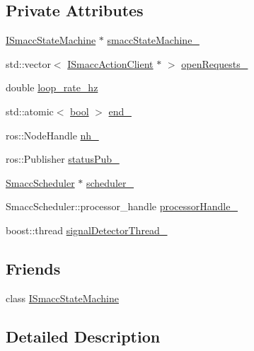 \subsection*{Private Attributes}
\begin{DoxyCompactItemize}
\item 
\hyperlink{classsmacc_1_1ISmaccStateMachine}{I\+Smacc\+State\+Machine} $\ast$ \hyperlink{classsmacc_1_1SignalDetector_a46025de6ac7b5980e22144f9703236a4}{smacc\+State\+Machine\+\_\+}
\item 
std\+::vector$<$ \hyperlink{classsmacc_1_1ISmaccActionClient}{I\+Smacc\+Action\+Client} $\ast$ $>$ \hyperlink{classsmacc_1_1SignalDetector_a3f7e46b9fa9fcac9f5bc72a95ab20ca9}{open\+Requests\+\_\+}
\item 
double \hyperlink{classsmacc_1_1SignalDetector_a41a2ae4262ed350f46d8b886bdc1dfa5}{loop\+\_\+rate\+\_\+hz}
\item 
std\+::atomic$<$ \hyperlink{classbool}{bool} $>$ \hyperlink{classsmacc_1_1SignalDetector_aaee266393c01693528a2d74b1f2354a2}{end\+\_\+}
\item 
ros\+::\+Node\+Handle \hyperlink{classsmacc_1_1SignalDetector_a5c416677fd537afc79f2fbc2e68b2dee}{nh\+\_\+}
\item 
ros\+::\+Publisher \hyperlink{classsmacc_1_1SignalDetector_ae065bbd4e699e5fce00fbc508dedd4c1}{status\+Pub\+\_\+}
\item 
\hyperlink{common_8h_a13d01c0cecec33c3093445edab0a7eb4}{Smacc\+Scheduler} $\ast$ \hyperlink{classsmacc_1_1SignalDetector_acf16adb82241eb97efd07530dd16c80d}{scheduler\+\_\+}
\item 
Smacc\+Scheduler\+::processor\+\_\+handle \hyperlink{classsmacc_1_1SignalDetector_ac5a7fe931a4cd3390219259c70533033}{processor\+Handle\+\_\+}
\item 
boost\+::thread \hyperlink{classsmacc_1_1SignalDetector_a4346a400cd37eafc5d1d2e63d975785e}{signal\+Detector\+Thread\+\_\+}
\end{DoxyCompactItemize}
\subsection*{Friends}
\begin{DoxyCompactItemize}
\item 
class \hyperlink{classsmacc_1_1SignalDetector_a0e71d23a61c07d55f419d02237d03b6a}{I\+Smacc\+State\+Machine}
\end{DoxyCompactItemize}


\subsection{Detailed Description}


